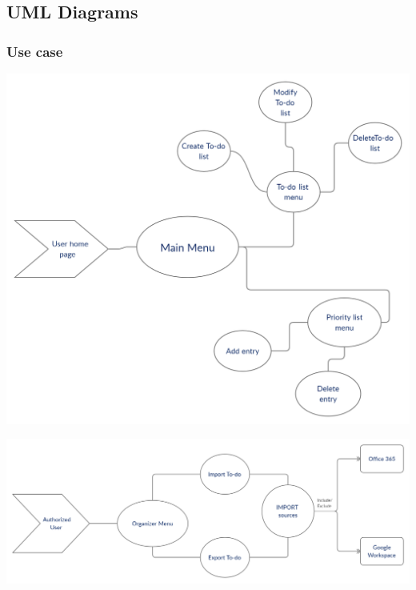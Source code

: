 \subsection{UML Diagrams}
\subsubsection{Use case}
\par
\includegraphics[width=\textwidth]{diagramusecase1}
\par
\includegraphics[width=\textwidth]{diagramusecase2}
